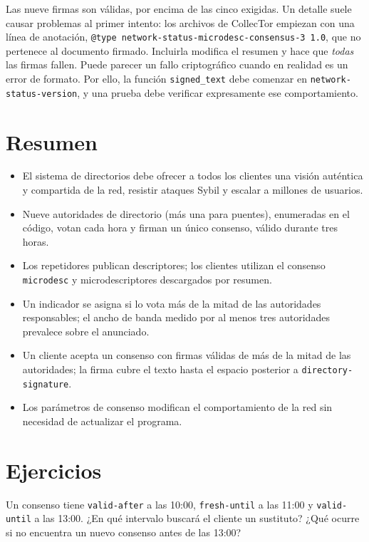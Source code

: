 Las nueve firmas son válidas, por encima de las cinco exigidas. Un detalle suele causar problemas al primer intento: los archivos de CollecTor empiezan con una línea de anotación, \texttt{@type network-status-microdesc-consensus-3 1.0}, que no pertenece al documento firmado. Incluirla modifica el resumen y hace que \emph{todas} las firmas fallen. Puede parecer un fallo criptográfico cuando en realidad es un error de formato. Por ello, la función \texttt{signed\_text} debe comenzar en \texttt{network-status-version}, y una prueba debe verificar expresamente ese comportamiento.

\section*{Resumen}
\begin{itemize}
  \item El sistema de directorios debe ofrecer a todos los clientes una visión auténtica y compartida de la red, resistir ataques Sybil y escalar a millones de usuarios.
  \item Nueve autoridades de directorio (más una para puentes), enumeradas en el código, votan cada hora y firman un único consenso, válido durante tres horas.
  \item Los repetidores publican descriptores; los clientes utilizan el consenso \texttt{microdesc} y microdescriptores descargados por resumen.
  \item Un indicador se asigna si lo vota más de la mitad de las autoridades responsables; el ancho de banda medido por al menos tres autoridades prevalece sobre el anunciado.
  \item Un cliente acepta un consenso con firmas válidas de más de la mitad de las autoridades; la firma cubre el texto hasta el espacio posterior a \texttt{directory-signature}.
  \item Los parámetros de consenso modifican el comportamiento de la red sin necesidad de actualizar el programa.
\end{itemize}

\section*{Ejercicios}

\begin{esercizio}[1]\label{es:12-validita}
Un consenso tiene \texttt{valid-after} a las 10:00, \texttt{fresh-until} a las 11:00 y \texttt{valid-until} a las 13:00. ¿En qué intervalo buscará el cliente un sustituto? ¿Qué ocurre si no encuentra un nuevo consenso antes de las 13:00?
\end{esercizio}

